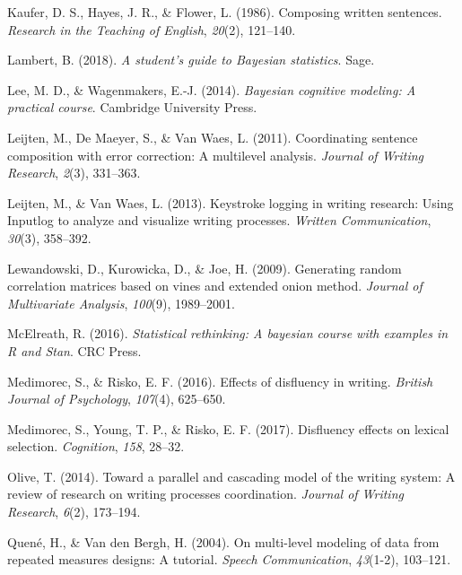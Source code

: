 \documentclass[english,man,floatsintext]{apa7}
\begin{document}
\leavevmode\hypertarget{ref-kaufer1986composing}{}%
Kaufer, D. S., Hayes, J. R., \& Flower, L. (1986). Composing written sentences. \emph{Research in the Teaching of English}, \emph{20}(2), 121--140.

\leavevmode\hypertarget{ref-lambert2018student}{}%
Lambert, B. (2018). \emph{A student's guide to Bayesian statistics}. Sage.

\leavevmode\hypertarget{ref-lee2014bayesian}{}%
Lee, M. D., \& Wagenmakers, E.-J. (2014). \emph{Bayesian cognitive modeling: A practical course}. Cambridge University Press.

\leavevmode\hypertarget{ref-leijten2011coordinating}{}%
Leijten, M., De Maeyer, S., \& Van Waes, L. (2011). Coordinating sentence composition with error correction: A multilevel analysis. \emph{Journal of Writing Research}, \emph{2}(3), 331--363.

\leavevmode\hypertarget{ref-leijten2013keystroke}{}%
Leijten, M., \& Van Waes, L. (2013). Keystroke logging in writing research: Using Inputlog to analyze and visualize writing processes. \emph{Written Communication}, \emph{30}(3), 358--392.

\leavevmode\hypertarget{ref-lewandowski2009generating}{}%
Lewandowski, D., Kurowicka, D., \& Joe, H. (2009). Generating random correlation matrices based on vines and extended onion method. \emph{Journal of Multivariate Analysis}, \emph{100}(9), 1989--2001.

\leavevmode\hypertarget{ref-mcelreath2016statistical}{}%
McElreath, R. (2016). \emph{Statistical rethinking: A bayesian course with examples in R and Stan}. CRC Press.

\leavevmode\hypertarget{ref-medimorec2016effects}{}%
Medimorec, S., \& Risko, E. F. (2016). Effects of disfluency in writing. \emph{British Journal of Psychology}, \emph{107}(4), 625--650.

\leavevmode\hypertarget{ref-medimorec2017disfluency}{}%
Medimorec, S., Young, T. P., \& Risko, E. F. (2017). Disfluency effects on lexical selection. \emph{Cognition}, \emph{158}, 28--32.

\leavevmode\hypertarget{ref-olive2014toward}{}%
Olive, T. (2014). Toward a parallel and cascading model of the writing system: A review of research on writing processes coordination. \emph{Journal of Writing Research}, \emph{6}(2), 173--194.

\leavevmode\hypertarget{ref-quene2004multi}{}%
Quené, H., \& Van den Bergh, H. (2004). On multi-level modeling of data from repeated measures designs: A tutorial. \emph{Speech Communication}, \emph{43}(1-2), 103--121.
\end{document}
